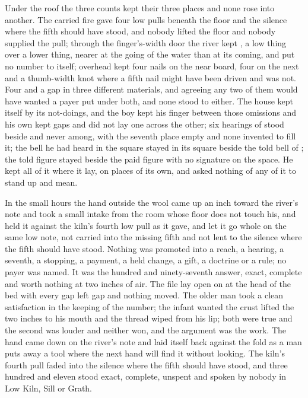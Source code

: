 Under the roof the three counts kept their three places and none rose into another. The carried fire gave four low pulls beneath the floor and the silence where the fifth should have stood, and nobody lifted the floor and nobody supplied the pull; through the finger's-width door the river kept , a low thing over a lower thing, nearer at the going of the water than at its coming, and put no number to itself; overhead  kept four nails on the near board, four on the next and a thumb-width knot where a fifth nail might have been driven and was not. Four and a gap in three different materials, and agreeing any two of them would have wanted a payer put under both, and none stood to either. The house kept itself by its not-doings, and the boy kept his finger between those omissions and his own kept gaps and did not lay one across the other; six hearings of  stood beside and never among, with the seventh place empty and none invented to fill it; the bell he had heard in the square stayed in its square beside the told bell of ; the told figure stayed beside the paid figure with no signature on the space. He kept all of it where it lay, on places of its own, and asked nothing of any of it to stand up and mean.

In the small hours the hand outside the wool came up an inch toward the river's note and took a small intake from the room whose floor does not touch his, and held it against the kiln's fourth low pull as it gave, and let it go whole on the same low note, not carried into the missing fifth and not lent to the silence where the fifth should have stood. Nothing was promoted into a reach, a hearing, a seventh, a stopping, a payment, a held change, a gift, a doctrine or a rule; no payer was named. It was the hundred and ninety-seventh answer, exact, complete and worth nothing at two inches of air. The file lay open on  at the head of the bed with every gap left gap and nothing moved. The older man took a clean satisfaction in the keeping of the number; the infant wanted the crust lifted the two inches to his mouth and the thread wiped from his lip; both were true and the second was louder and neither won, and the argument was the work. The hand came down on the river's note and laid itself back against the fold as a man puts away a tool where the next hand will find it without looking. The kiln's fourth pull faded into the silence where the fifth should have stood, and three hundred and eleven stood exact, complete, unspent and spoken by nobody in Low Kiln, Sill or Grath.
